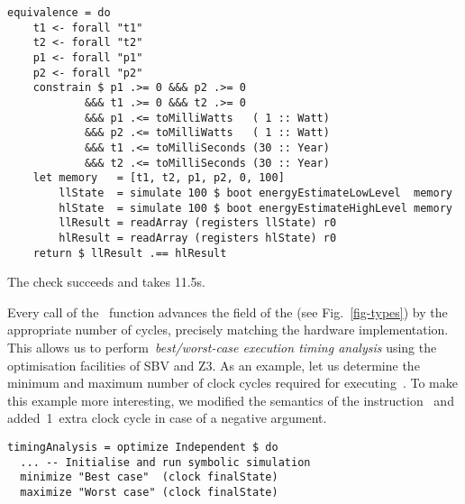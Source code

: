 \vspace{1mm}
\begin{verbatim}
equivalence = do
    t1 <- forall "t1"
    t2 <- forall "t2"
    p1 <- forall "p1"
    p2 <- forall "p2"
    constrain $ p1 .>= 0 &&& p2 .>= 0
            &&& t1 .>= 0 &&& t2 .>= 0
            &&& p1 .<= toMilliWatts   ( 1 :: Watt)
            &&& p2 .<= toMilliWatts   ( 1 :: Watt)
            &&& t1 .<= toMilliSeconds (30 :: Year)
            &&& t2 .<= toMilliSeconds (30 :: Year)
    let memory   = [t1, t2, p1, p2, 0, 100]
        llState  = simulate 100 $ boot energyEstimateLowLevel  memory
        hlState  = simulate 100 $ boot energyEstimateHighLevel memory
        llResult = readArray (registers llState) r0
        hlResult = readArray (registers hlState) r0
    return $ llResult .== hlResult
\end{verbatim}
\vspace{1mm}

\noindent
The  check succeeds and takes 11.5s.

Every call of the~ function advances the  field
of the  (see Fig.~\ref{fig-types}) by the appropriate number of
cycles, precisely matching the hardware implementation. This allows us to
perform~\emph{best/worst-case execution timing analysis} using the
optimisation facilities of SBV and Z3. As an example,
let us determine the minimum and maximum number of clock cycles required for
executing~. To make this example more
interesting, we modified the semantics of the instruction~ and
added~1~extra clock cycle in case of a negative argument.


\vspace{1mm}
\begin{verbatim}
timingAnalysis = optimize Independent $ do
  ... -- Initialise and run symbolic simulation
  minimize "Best case"  (clock finalState)
  maximize "Worst case" (clock finalState)
\end{verbatim}
\vspace{1mm}

